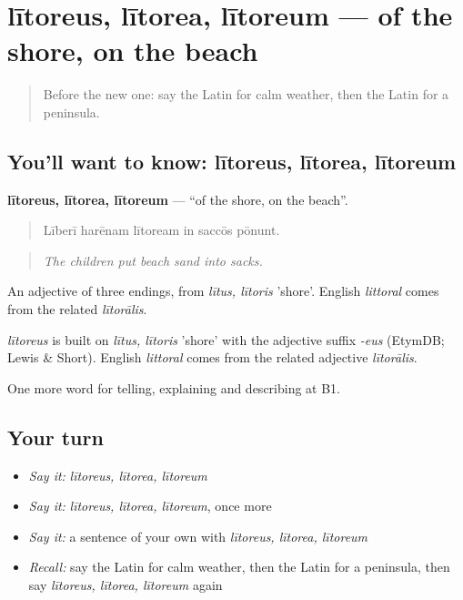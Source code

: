 \section[lītoreus, lītorea, lītoreum]{lītoreus, lītorea, lītoreum — of the shore, on the beach}

\label{lesson:LA-C444-litoreus}



\begin{quote}
Before the new one: say the Latin for calm weather, then the Latin for a peninsula.
\end{quote}

\subsection*{You'll want to know: lītoreus, lītorea, lītoreum}
\textbf{lītoreus, lītorea, lītoreum} — \textquotedblleft{}of the shore, on the beach\textquotedblright{}.

\begin{quote}
Līberī harēnam lītoream in saccōs pōnunt.
\end{quote}

\begin{quote}
\emph{The children put beach sand into sacks.}
\end{quote}

An adjective of three endings, from \emph{lītus, lītoris} 'shore'. English \emph{littoral} comes from the related \emph{lītorālis}.

\begin{cousinweb}
\emph{lītoreus} is built on \emph{lītus, lītoris} 'shore' with the adjective suffix \emph{-eus} (EtymDB; Lewis \& Short). English \emph{littoral} comes from the related adjective \emph{lītorālis}.
\end{cousinweb}

\begin{grammarlens}[title={What you've built}]
One more word for telling, explaining and describing at B1.
\end{grammarlens}

\subsection*{Your turn}
\begin{itemize}
\raggedright
  \item \emph{Say it:} \emph{lītoreus, lītorea, lītoreum}
  \item \emph{Say it:} \emph{lītoreus, lītorea, lītoreum}, once more
  \item \emph{Say it:} a sentence of your own with \emph{lītoreus, lītorea, lītoreum}
  \item \emph{Recall:} say the Latin for calm weather, then the Latin for a peninsula, then say \emph{lītoreus, lītorea, lītoreum} again
\end{itemize}

